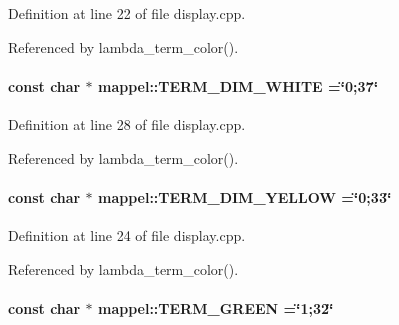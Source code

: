 Definition at line 22 of file display.\+cpp.



Referenced by lambda\+\_\+term\+\_\+color().

\paragraph[{\texorpdfstring{T\+E\+R\+M\+\_\+\+D\+I\+M\+\_\+\+W\+H\+I\+TE}{TERM_DIM_WHITE}}]{\setlength{\rightskip}{0pt plus 5cm}const char $\ast$ mappel\+::\+T\+E\+R\+M\+\_\+\+D\+I\+M\+\_\+\+W\+H\+I\+TE =\char`\"{}0;37\char`\"{}}\hypertarget{namespacemappel_a15d16c02d9b595b272213768978e691b}{}\label{namespacemappel_a15d16c02d9b595b272213768978e691b}


Definition at line 28 of file display.\+cpp.



Referenced by lambda\+\_\+term\+\_\+color().

\paragraph[{\texorpdfstring{T\+E\+R\+M\+\_\+\+D\+I\+M\+\_\+\+Y\+E\+L\+L\+OW}{TERM_DIM_YELLOW}}]{\setlength{\rightskip}{0pt plus 5cm}const char $\ast$ mappel\+::\+T\+E\+R\+M\+\_\+\+D\+I\+M\+\_\+\+Y\+E\+L\+L\+OW =\char`\"{}0;33\char`\"{}}\hypertarget{namespacemappel_af34f15f5200f5711a39b0dd715907f61}{}\label{namespacemappel_af34f15f5200f5711a39b0dd715907f61}


Definition at line 24 of file display.\+cpp.



Referenced by lambda\+\_\+term\+\_\+color().

\paragraph[{\texorpdfstring{T\+E\+R\+M\+\_\+\+G\+R\+E\+EN}{TERM_GREEN}}]{\setlength{\rightskip}{0pt plus 5cm}const char $\ast$ mappel\+::\+T\+E\+R\+M\+\_\+\+G\+R\+E\+EN =\char`\"{}1;32\char`\"{}}\hypertarget{namespacemappel_a7beb463b118be1cd8c591eaf053d7f5c}{}\label{namespacemappel_a7beb463b118be1cd8c591eaf053d7f5c}



